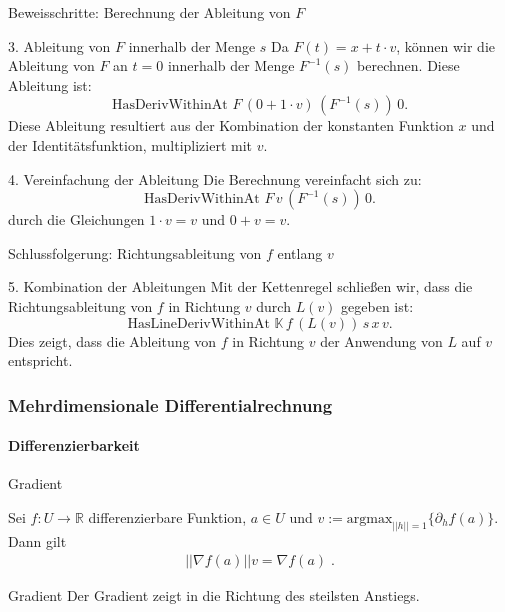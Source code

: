\documentclass{beamer}
\begin{document}
    \begin{frame}{Beweisschritte: Berechnung der Ableitung von \( F \)}
        \begin{block}{3. Ableitung von \( F \) innerhalb der Menge \( s \)}
            Da \( F(t) = x + t \cdot v \), können wir die Ableitung von \( F \) an \( t = 0 \) innerhalb der Menge \( F^{-1}(s) \) berechnen. Diese Ableitung ist:
            \[
            \text{HasDerivWithinAt } F \, (0 + 1 \cdot v) \, (F^{-1}(s)) \, 0.
            \]
            Diese Ableitung resultiert aus der Kombination der konstanten Funktion \( x \) und der Identitätsfunktion, multipliziert mit \( v \).
        \end{block}
    
        \begin{block}{4. Vereinfachung der Ableitung}
            Die Berechnung vereinfacht sich zu:
            \[
            \text{HasDerivWithinAt } F \, v \, (F^{-1}(s)) \, 0.
            \]
            durch die Gleichungen \( 1 \cdot v = v \) und \( 0 + v = v \).
        \end{block}
    \end{frame}
    
    \begin{frame}{Schlussfolgerung: Richtungsableitung von \( f \) entlang \( v \)}
        \begin{block}{5. Kombination der Ableitungen}
            Mit der Kettenregel schließen wir, dass die Richtungsableitung von \( f \) in Richtung \( v \) durch \( L(v) \) gegeben ist:
            \[
            \text{HasLineDerivWithinAt } \mathbb{K} \, f \, (L(v)) \, s \, x \, v.
            \]
            Dies zeigt, dass die Ableitung von \( f \) in Richtung \( v \) der Anwendung von \( L \) auf \( v \) entspricht.
        \end{block}
    \end{frame}



    
    \begin{frame}
        \frametitle{Mehrdimensionale Differentialrechnung}
    \framesubtitle{Differenzierbarkeit}
        \begin{block}{Gradient}
    
    Sei   $f: U \to \mathbb{R}$ differenzierbare Funktion,  $a \in U$ und $v := \text{argmax}_{ ||h|| = 1 } \{ \partial_h f(a) \}$.
    Dann gilt 
    \begin{align*}
    || \nabla f(a) || v =  \nabla f(a) \; .
    \end{align*} 
    \end{block}
    \begin{block}{Gradient}
    Der Gradient zeigt in die Richtung des steilsten Anstiegs.
    \end{block}
    
     \end{frame}
    
\end{document}
